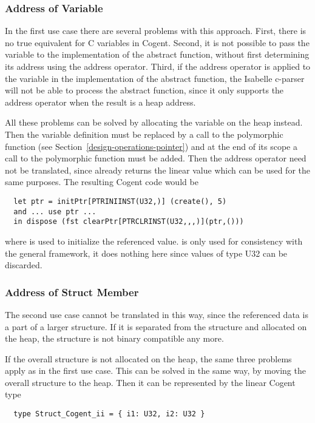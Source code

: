 \subsubsection{Address of Variable}

In the first use case there are several problems with this approach. First, there is no true equivalent
for C variables in Cogent. Second, it is not possible to pass the variable to the implementation of the
abstract function, without first determining its address using the address operator. Third, if the address
operator is applied to the variable in the implementation of the abstract function, the Isabelle c-parser
will not be able to process the abstract function, since it only supports the address operator when 
the result is a heap address.

All these problems can be solved by allocating the variable on the heap instead. Then the variable definition
must be replaced by a call to the polymorphic function  (see Section~\ref{design-operations-pointer}) and 
at the end of its scope a call to the polymorphic function  must be added. Then the address
operator need not be translated, since  already returns the linear value which can be 
used for the same purposes. The resulting Cogent code would be
\begin{verbatim}
  let ptr = initPtr[PTRINIINST(U32,)] (create(), 5)
  and ... use ptr ...
  in dispose (fst clearPtr[PTRCLRINST(U32,,,)](ptr,()))
\end{verbatim}
where  is used to initialize the referenced value.  is only used for consistency
with the general framework, it does nothing here since values of type U32 can be discarded.

\subsubsection{Address of Struct Member}

The second use case cannot be translated in this way, since the referenced data is a part of a larger structure.
If it is separated from the structure and allocated on the heap, the structure is not binary compatible any more.

If the overall structure is not allocated on the heap, the same three problems apply as in the first use case.
This can be solved in the same way, by moving the overall structure to the heap. Then it can be represented
by the linear Cogent type
\begin{verbatim}
  type Struct_Cogent_ii = { i1: U32, i2: U32 }
\end{verbatim}

